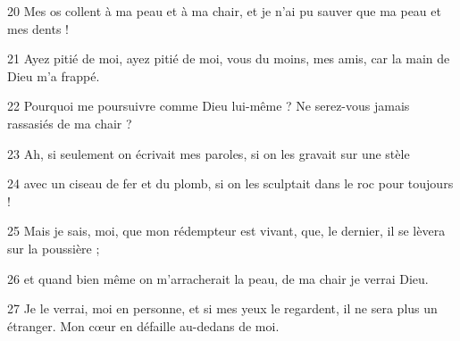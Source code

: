 20 Mes os collent à ma peau et à ma chair, et je n’ai pu sauver que ma peau et mes dents !

21 Ayez pitié de moi, ayez pitié de moi, vous du moins, mes amis, car la main de Dieu m’a frappé.

22 Pourquoi me poursuivre comme Dieu lui-même ? Ne serez-vous jamais rassasiés de ma chair ?

23 Ah, si seulement on écrivait mes paroles, si on les gravait sur une stèle

24 avec un ciseau de fer et du plomb, si on les sculptait dans le roc pour toujours !

25 Mais je sais, moi, que mon rédempteur est vivant, que, le dernier, il se lèvera sur la poussière ;

26 et quand bien même on m’arracherait la peau, de ma chair je verrai Dieu.

27 Je le verrai, moi en personne, et si mes yeux le regardent, il ne sera plus un étranger. Mon cœur en défaille au-dedans de moi.
